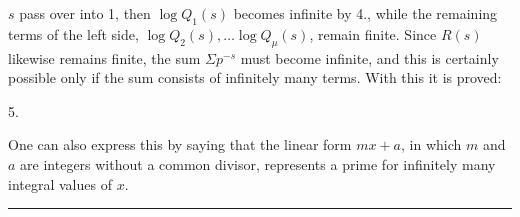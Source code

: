 $s$ pass over into 1, then $\log Q_1(s)$ becomes infinite by 4., while the remaining terms of the left side, $\log Q_2(s), \ldots \log Q_\mu(s)$, remain finite. Since $R(s)$ likewise remains finite, the sum $\Sigma p^{-s}$ must become infinite, and this is certainly possible only if the sum consists of infinitely many terms. With this it is proved:

5. 

One can also express this by saying that the linear form $mx + a$, in which $m$ and $a$ are integers without a common divisor, represents a prime for infinitely many integral values of $x$.

\begin{center}
\rule{4cm}{0.4pt}
\end{center}

